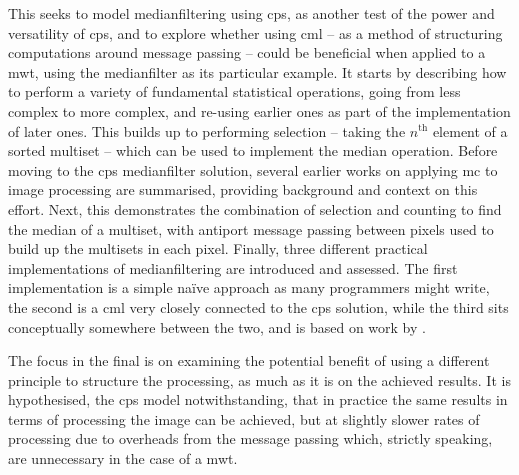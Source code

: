 This  seeks to model \gls{medianfilter}ing using \gls{cps}, as another test of the power and versatility of \gls{cps}, and to explore whether using \gls{cml} -- as a method of structuring computations around message passing -- could be beneficial when applied to a \gls{mwt}, using the \gls{medianfilter} as its particular example.  It starts by describing how to perform a variety of fundamental statistical operations, going from less complex to more complex, and re-using earlier ones as part of the implementation of later ones.  This builds up to performing selection -- taking the \(n^{\text{th}}\) element of a sorted multiset -- which can be used to implement the median operation.  Before moving to the \gls{cps} \gls{medianfilter} solution, several earlier works on applying \gls{mc} to image processing are summarised, providing background and context on this effort.  Next, this  demonstrates the combination of selection and counting to find the median of a multiset, with antiport message passing between pixels used to build up the multisets in each pixel.  Finally, three different practical implementations of \gls{medianfilter}ing are introduced and assessed.  The first implementation is a simple naïve approach as many programmers might write, the second is a \gls{cml} very closely connected to the \gls{cps} solution, while the third sits conceptually somewhere between the two, and is based on work by \citeauthor{Braunl2001} \cite{Braunl2001}.

The focus in the final  is on examining the potential benefit of using a different principle to structure the processing, as much as it is on the achieved results.  It is hypothesised, the \gls{cps} model notwithstanding, that in practice the same results in terms of processing the image can be achieved, but at slightly slower rates of processing due to overheads from the message passing which, strictly speaking, are unnecessary in the case of a \gls{mwt}.